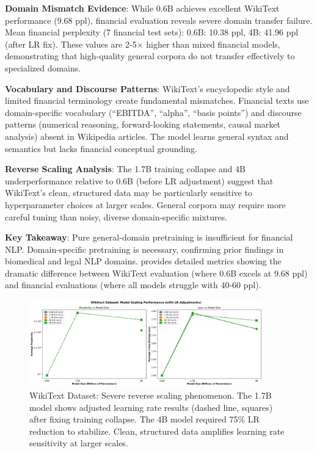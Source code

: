 \textbf{Domain Mismatch Evidence}: While 0.6B achieves excellent WikiText performance (9.68 ppl), financial evaluation reveals severe domain transfer failure. Mean financial perplexity (7 financial test sets): 0.6B: 10.38 ppl, 4B: 41.96 ppl (after LR fix). These values are 2-5$\times$ higher than mixed financial models, demonstrating that high-quality general corpora do not transfer effectively to specialized domains.

\textbf{Vocabulary and Discourse Patterns}: WikiText's encyclopedic style and limited financial terminology create fundamental mismatches. Financial texts use domain-specific vocabulary (``EBITDA'', ``alpha'', ``basis points'') and discourse patterns (numerical reasoning, forward-looking statements, causal market analysis) absent in Wikipedia articles. The model learns general syntax and semantics but lacks financial conceptual grounding.

\textbf{Reverse Scaling Analysis}: The 1.7B training collapse and 4B underperformance relative to 0.6B (before LR adjustment) suggest that WikiText's clean, structured data may be particularly sensitive to hyperparameter choices at larger scales. General corpora may require more careful tuning than noisy, diverse domain-specific mixtures.

\textbf{Key Takeaway}: Pure general-domain pretraining is insufficient for financial NLP. Domain-specific pretraining is necessary, confirming prior findings in biomedical and legal NLP domains.  provides detailed metrics showing the dramatic difference between WikiText evaluation (where 0.6B excels at 9.68 ppl) and financial evaluations (where all models struggle with 40-60 ppl).

\begin{figure}[h]
\centering
\includegraphics[width=0.9\textwidth]{figures/scaling_wikitext.png}
\caption[WikiText Dataset: Reverse Scaling]{WikiText Dataset: Severe reverse scaling phenomenon. The 1.7B model shows adjusted learning rate results (dashed line, squares) after fixing training collapse. The 4B model required 75\% LR reduction to stabilize. Clean, structured data amplifies learning rate sensitivity at larger scales.}
\label{fig:scaling_wikitext}
\end{figure}

